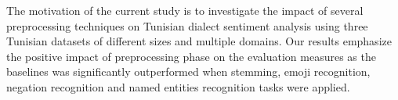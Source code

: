 The motivation of the current study is to investigate the impact of several preprocessing techniques on Tunisian dialect sentiment analysis using three Tunisian datasets of different sizes and multiple domains. Our results emphasize the positive impact of preprocessing phase on the evaluation measures as the baselines was significantly outperformed when stemming, emoji recognition, negation recognition and named entities recognition tasks were applied.
